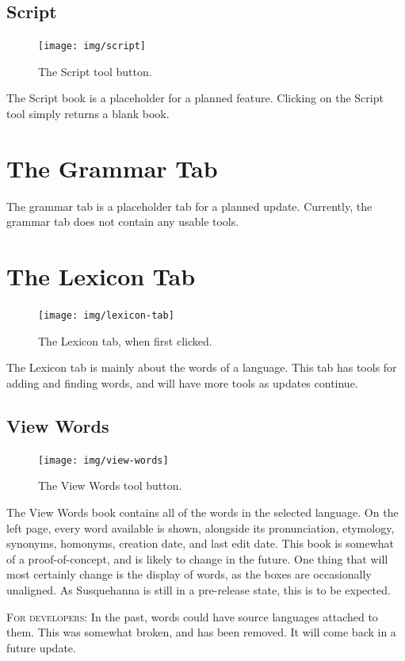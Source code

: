 \documentclass{report}
\begin{document}
	\section{Script}
	\begin{figure}
		\centering
		\texttt{[image: img/script]}
		\caption{The Script tool button.}
		\label{fig:script}
	\end{figure}
	The Script book is a placeholder for a planned feature. Clicking on the Script tool simply returns a blank book.
	
	\chapter{The Grammar Tab}
	The grammar tab is a placeholder tab for a planned update. Currently, the grammar tab
	does not contain any usable tools.
	
	\chapter{The Lexicon Tab}
	\begin{figure}[ht]
		\centering
		\texttt{[image: img/lexicon-tab]}
		\caption{The Lexicon tab, when first clicked.}
		\label{fig:lexicon-tab}
	\end{figure}
	The Lexicon tab is mainly about the words of a language. This tab has tools for adding and finding words, and will have more tools as updates continue.
	\newpage 
	\section{View Words}
	\begin{figure}
		\centering
		\texttt{[image: img/view-words]}
		\caption{The View Words tool button.}
		\label{fig:view-words}
	\end{figure}
	The View Words book contains all of the words in the selected language. On the left page, every word available is shown, alongside its pronunciation, etymology, synonyms, homonyms, creation date, and last edit date. This book is somewhat of a proof-of-concept, and is likely to change in the future. One thing that will most certainly change is the display of words, as the boxes are occasionally unaligned. As Susquehanna is still in a pre-release state, this is to be expected.
	\begin{tcolorbox}[width=1\textwidth]
		\textsc{For developers:} In the past, words could have source languages attached to them. This was somewhat broken, and has been removed. It will come back in a future update.
	\end{tcolorbox}
\end{document}
